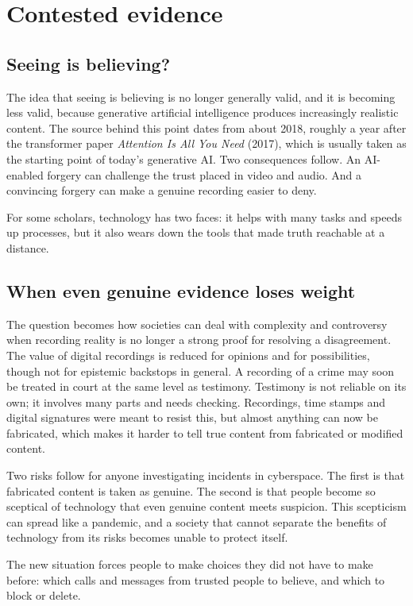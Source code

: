 \section{Contested evidence}

\subsection{Seeing is believing?}
The idea that seeing is believing is no longer generally valid, and it is becoming less valid, because generative artificial intelligence produces increasingly realistic content. The source behind this point dates from about 2018, roughly a year after the transformer paper \emph{Attention Is All You Need} (2017), which is usually taken as the starting point of today's generative AI. Two consequences follow. An AI-enabled forgery can challenge the trust placed in video and audio. And a convincing forgery can make a genuine recording easier to deny.

For some scholars, technology has two faces: it helps with many tasks and speeds up processes, but it also wears down the tools that made truth reachable at a distance.

\subsection{When even genuine evidence loses weight}
The question becomes how societies can deal with complexity and controversy when recording reality is no longer a strong proof for resolving a disagreement. The value of digital recordings is reduced for opinions and for possibilities, though not for epistemic backstops in general. A recording of a crime may soon be treated in court at the same level as testimony. Testimony is not reliable on its own; it involves many parts and needs checking. Recordings, time stamps and digital signatures were meant to resist this, but almost anything can now be fabricated, which makes it harder to tell true content from fabricated or modified content.

Two risks follow for anyone investigating incidents in cyberspace. The first is that fabricated content is taken as genuine. The second is that people become so sceptical of technology that even genuine content meets suspicion. This scepticism can spread like a pandemic, and a society that cannot separate the benefits of technology from its risks becomes unable to protect itself.

The new situation forces people to make choices they did not have to make before: which calls and messages from trusted people to believe, and which to block or delete.


